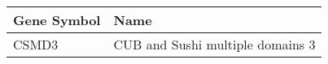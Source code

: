 \begin{tabular}{ll}
\toprule
Gene Symbol &                             Name \\
\midrule
      CSMD3 & CUB and Sushi multiple domains 3 \\
\bottomrule
\end{tabular}
